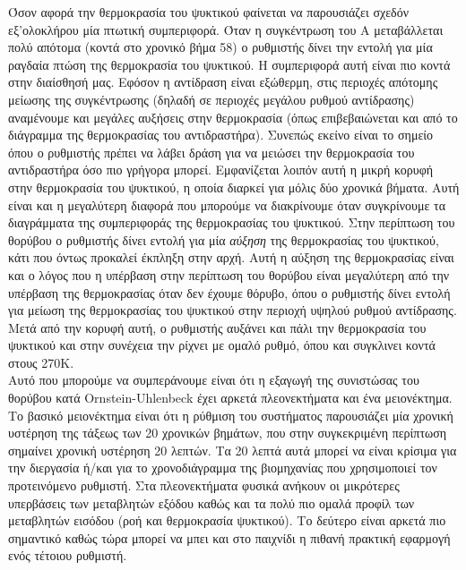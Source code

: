 \documentclass[11pt]{article} %
\numberwithin{equation}{subsection}
\begin{document}
Όσον αφορά την θερμοκρασία του ψυκτικού φαίνεται να παρουσιάζει σχεδόν εξ'ολοκλήρου μία πτωτική συμπεριφορά. Όταν η συγκέντρωση του Α μεταβάλλεται πολύ απότομα (κοντά στο χρονικό βήμα 58) ο ρυθμιστής δίνει την εντολή για μία ραγδαία πτώση της θερμοκρασία του ψυκτικού. Η συμπεριφορά αυτή είναι πιο κοντά στην διαίσθησή μας.  Εφόσον η αντίδραση είναι εξώθερμη, στις περιοχές απότομης μείωσης της συγκέντρωσης (δηλαδή σε περιοχές μεγάλου ρυθμού αντίδρασης) αναμένουμε και μεγάλες αυξήσεις στην θερμοκρασία (όπως επιβεβαιώνεται και από το διάγραμμα της θερμοκρασίας του αντιδραστήρα). Συνεπώς εκείνο είναι το σημείο όπου ο ρυθμιστής πρέπει να λάβει δράση για να μειώσει την θερμοκρασία του αντιδραστήρα όσο πιο γρήγορα μπορεί. Εμφανίζεται λοιπόν αυτή η μικρή κορυφή στην θερμοκρασία του ψυκτικού, η οποία διαρκεί για μόλις δύο χρονικά βήματα. Αυτή είναι και η μεγαλύτερη διαφορά που μπορούμε να διακρίνουμε όταν συγκρίνουμε τα διαγράμματα της συμπεριφοράς της θερμοκρασίας του ψυκτικού. Στην περίπτωση του θορύβου ο ρυθμιστής δίνει εντολή για μία \textit{αύξηση} της θερμοκρασίας του ψυκτικού, κάτι που όντως προκαλεί έκπληξη στην αρχή. Αυτή η αύξηση της θερμοκρασίας είναι και ο λόγος που η υπέρβαση στην περίπτωση του θορύβου είναι μεγαλύτερη από την υπέρβαση της θερμοκρασίας όταν δεν έχουμε θόρυβο, όπου ο ρυθμιστής δίνει εντολή για μείωση της θερμοκρασίας του ψυκτικού στην περιοχή υψηλού ρυθμού αντίδρασης. Μετά από την κορυφή αυτή, ο ρυθμιστής αυξάνει και πάλι την θερμοκρασία του ψυκτικού και στην συνέχεια την ρίχνει με ομαλό ρυθμό, όπου και συγκλινει κοντά στους 270K.\\

Αυτό που μπορούμε να συμπεράνουμε είναι ότι η εξαγωγή της συνιστώσας του θορύβου κατά Ornstein-Uhlenbeck έχει αρκετά πλεονεκτήματα και ένα μειονέκτημα. Το βασικό μειονέκτημα είναι ότι η ρύθμιση του συστήματος παρουσιάζει μία χρονική υστέρηση της τάξεως των 20 χρονικών βημάτων, που στην συγκεκριμένη περίπτωση σημαίνει χρονική υστέρηση 20 λεπτών. Τα 20 λεπτά αυτά μπορεί να είναι κρίσιμα για την διεργασία ή/και για το χρονοδιάγραμμα της βιομηχανίας που χρησιμοποιεί τον προτεινόμενο ρυθμιστή. Στα πλεονεκτήματα φυσικά ανήκουν οι μικρότερες υπερβάσεις των μεταβλητών εξόδου καθώς και τα πολύ πιο ομαλά προφίλ των μεταβλητών εισόδου (ροή και θερμοκρασία ψυκτικού). Το δεύτερο είναι αρκετά πιο σημαντικό καθώς τώρα μπορεί να μπει και στο παιχνίδι η πιθανή πρακτική εφαρμογή ενός τέτοιου ρυθμιστή. \\
\end{document}
